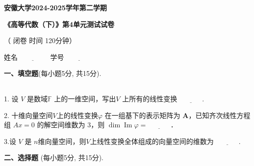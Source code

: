 \documentclass[11pt,a4paper]{article}
\renewcommand{\arraystretch}{0.8}
\begin{document}
	
	
	\fancyhf{}
	
	
	
	
	\vspace{0em}
	\begin{center}
		{\bf \Large 安徽大学2024-2025学年第二学期}
		
		\vspace{2mm}
		
		{\bf \Large {《高等代数（下）}》第4单元测试试卷}
		
		\vspace{5mm}
		
		{\large（ 闭卷 \quad 时间 120分钟）}
		
		\vspace{0.5cm}
		
		姓名$\underline{~~~~~~~~~~~~~~~~~~~~}$
		学号$\underline{~~~~~~~~~~~~~~~~~~~~}$\\
		\vspace{0.3cm}
	\end{center}
	\setlength{\parindent}{0pt}
	{\bf 一、填空题}{(每小题5分, 共15分).}
	\renewcommand{\arraystretch}{1.2}
	\hfill
	\begin{tabular}{|c|c|}
		\hline
		\makebox[2.5em]{得分} & \makebox[3.0em]{} \\
		\hline
	\end{tabular}
	\renewcommand{\arraystretch}{1.0}
	\vspace{0.1cm}
	
	1.  设 $ V$ 是数域$\mathbb{F}$ 上的一维空间，写出$ V$ 上所有的线性变换 $\underline{~~~~~~~~~~~~~~~}$.
	
	2. 十维向量空间$  V  $上的线性变换$  \varphi $ 在一组基下的表示矩阵为  $\boldsymbol{A}  $，已知齐次线性方程组 $ A x=0 $ 的解空间维数为 $3 $，则  $\operatorname{dim} \operatorname{Im} \varphi=\underline{~~~~~~~~~~~~~~~}$．
	
	
	3.设 $ V$  是 $ n $维向量空间，则$V$上线性变换全体组成的向量空间的维数为 $\underline{~~~~~~~~~~~~~~~}$.
	\vspace{0.1cm}
	\renewcommand{\arraystretch}{0.8}
	
	{\bf 二、选择题}
	{(每小题5分, 共15分).}
	\renewcommand{\arraystretch}{1.2}
	\hfill
	\begin{tabular}{|c|c|}
		\hline
		\makebox[2.5em]{得分} & \makebox[3.0em]{} \\
		\hline
	\end{tabular}
	\renewcommand{\arraystretch}{1.0}
	
\end{document}

